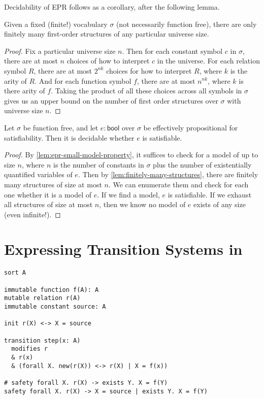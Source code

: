 Decidability of EPR follows as a corollary, after the following lemma.
\begin{lemma}\label{lem:finitely-many-structures}
  Given a fixed (finite!) vocabulary $\sigma$ (not necessarily function free),
  there are only finitely many first-order structures of any particular universe size.
\end{lemma}
\begin{proof}
  Fix a particular universe size $n$. Then for each constant symbol $c$ in
  $\sigma$, there are at most $n$ choices of how to interpret $c$ in the universe.
  For each relation symbol $R$, there are at most $2^{nk}$ choices for how to interpret $R$, where $k$ is the arity of $R$.
  And for each function symbol $f$, there are at most $n^{nk}$, where $k$ is there arity of $f$.
  Taking the product of all these choices across all symbols in $\sigma$ gives us an upper bound on the number of first order structures
  over $\sigma$ with universe size $n$.
\end{proof}

\begin{theorem}
  Let $\sigma$ be function free,
  and let $e : \mathsf{bool}$ over $\sigma$ be effectively propositional for satisfiability.
  Then it is decidable whether $e$ is satisfiable.
\end{theorem}
\begin{proof}
  By \cref{lem:epr-small-model-property}, it suffices to check for a model of up to size $n$,
  where $n$ is the number of constants in $\sigma$
  plus the number of existentially quantified variables of $e$.
  Then by \cref{lem:finitely-many-structures},
  there are finitely many structures of size at most $n$.
  We can enumerate them and check for each one
  whether it is a model of $e$.
  If we find a model, $e$ is satisfiable.
  If we exhaust all structures of size at most $n$,
  then we know no model of $e$ exists of any size (even infinite!).
\end{proof}



\section{Expressing Transition Systems in \mypyvy}

\begin{verbatim}
sort A

immutable function f(A): A
mutable relation r(A)
immutable constant source: A

init r(X) <-> X = source

transition step(x: A)
  modifies r
  & r(x)
  & (forall X. new(r(X)) <-> r(X) | X = f(x))

# safety forall X. r(X) -> exists Y. X = f(Y)
safety forall X. r(X) -> X = source | exists Y. X = f(Y)
\end{verbatim}

